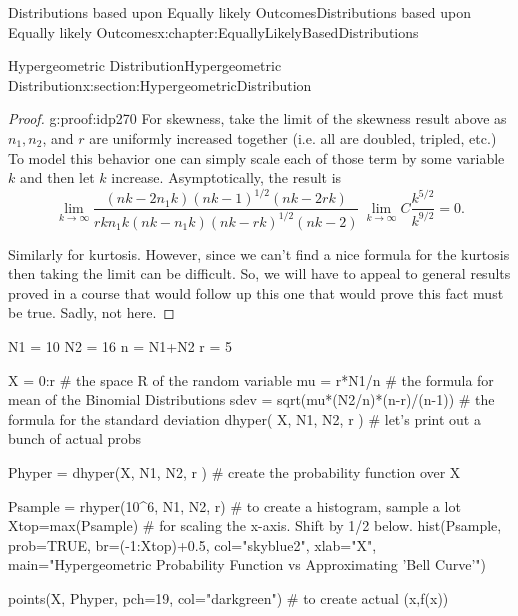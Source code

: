 \documentclass[oneside,10pt,]{book}
\numberwithin{equation}{section}
\begin{document}
\begin{chapterptx}{Distributions based upon Equally likely Outcomes}{}{Distributions based upon Equally likely Outcomes}{}{}{x:chapter:EquallyLikelyBasedDistributions}
\begin{sectionptx}{Hypergeometric Distribution}{}{Hypergeometric Distribution}{}{}{x:section:HypergeometricDistribution}
\begin{proof}{}{g:proof:idp270}
For skewness, take the limit of the skewness result above as \(n_1, n_2\), and \(r\) are uniformly increased together (i.e. all are doubled, tripled, etc.) To model this behavior one can simply scale each of those term by some variable \(k\) and then let \(k\) increase. Asymptotically, the result is%
\begin{equation*}
\lim_{k \rightarrow \infty} \frac{(nk-2n_1k)(nk-1)^{1/2}(nk-2rk)}{rkn_1k(nk-n_1k)(nk-rk)^{1/2}(nk-2)} ~ \lim_{k \rightarrow \infty} C \frac{k^{5/2}}{k^{9/2}}= 0.
\end{equation*}
%
\par
Similarly for kurtosis.  However, since we can't find a nice formula for the kurtosis then taking the limit can be difficult.  So, we will have to appeal to general results proved in a course that would follow up this one that would prove this fact must be true. Sadly, not here.%
\end{proof}
\leavevmode%
\begin{sageinput}
N1 = 10
N2 = 16
n = N1+N2
r = 5

X = 0:r        # the space R of the random variable 
mu = r*N1/n      # the formula for mean of the Binomial Distributions
sdev = sqrt(mu*(N2/n)*(n-r)/(n-1))  # the formula for the standard deviation
dhyper( X, N1, N2, r )   # let's print out a bunch of actual probs

Phyper = dhyper(X, N1, N2, r )  # create the probability function over X

Psample = rhyper(10^6, N1, N2, r)  # to create a histogram, sample a lot
Xtop=max(Psample)          # for scaling the x-axis. Shift by 1/2 below.
hist(Psample, prob=TRUE, br=(-1:Xtop)+0.5, col="skyblue2", xlab="X", 
  main="Hypergeometric Probability Function vs Approximating 'Bell Curve'")

points(X, Phyper, pch=19, col="darkgreen")  # to create actual (x,f(x))


\end{sageinput}
\end{sectionptx}
\end{chapterptx}
\end{document}
